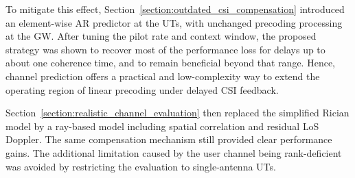 To mitigate this effect, Section~\ref{section:outdated_csi_compensation} introduced an element-wise \ac{AR} predictor at the \acp{UT}, with unchanged precoding processing at the \ac{GW}.
After tuning the pilot rate and context window, the proposed strategy was shown to recover most of the performance loss for delays up to about one coherence time, and to remain beneficial beyond that range.
Hence, channel prediction offers a practical and low-complexity way to extend the operating region of linear precoding under delayed \ac{CSI} feedback.

Section~\ref{section:realistic_channel_evaluation} then replaced the simplified Rician model by a ray-based model including spatial correlation and residual \ac{LoS} Doppler.
The same compensation mechanism still provided clear performance gains.
The additional limitation caused by the user channel being rank-deficient was avoided by restricting the evaluation to single-antenna \acp{UT}.
\bigskip

